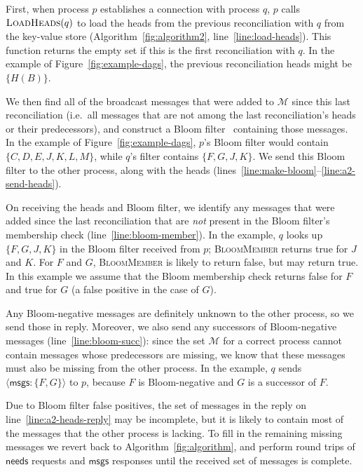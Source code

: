 \documentclass[a4paper,anonymous,USenglish]{lipics-v2019}
\begin{document}
First, when process $p$ establishes a connection with process $q$, $p$ calls $\textsc{LoadHeads}(q)$ to load the heads from the previous reconciliation with $q$ from the key-value store (Algorithm~\ref{fig:algorithm2}, line~\ref{line:load-heads}).
This function returns the empty set if this is the first reconciliation with $q$.
In the example of Figure~\ref{fig:example-dags}, the previous reconciliation heads might be $\{H(B)\}$.

We then find all of the broadcast messages that were added to $\mathcal{M}$ since this last reconciliation (i.e.\ all messages that are not among the last reconciliation's heads or their predecessors), and construct a Bloom filter~\cite{Bloom:1970} containing those messages.
In the example of Figure~\ref{fig:example-dags}, $p$'s Bloom filter would contain $\{C, D, E, J, K, L, M\}$, while $q$'s filter contains $\{F, G, J, K\}$.
We send this Bloom filter to the other process, along with the heads (lines~\ref{line:make-bloom}--\ref{line:a2-send-heads}).

On receiving the heads and Bloom filter, we identify any messages that were added since the last reconciliation that are \emph{not} present in the Bloom filter's membership check (line~\ref{line:bloom-member}).
In the example, $q$ looks up $\{F, G, J, K\}$ in the Bloom filter received from $p$; \textsc{BloomMember} returns true for $J$ and $K$. For $F$ and $G$, \textsc{BloomMember} is likely to return false, but may return true.
In this example we assume that the Bloom membership check returns false for $F$ and true for $G$ (a false positive in the case of $G$).

Any Bloom-negative messages are definitely unknown to the other process, so we send those in reply.
Moreover, we also send any successors of Bloom-negative messages (line~\ref{line:bloom-succ}): since the set $\mathcal{M}$ for a correct process cannot contain messages whose predecessors are missing, we know that these messages must also be missing from the other process.
In the example, $q$ sends $\langle\mathsf{msgs}: \{F, G\}\rangle$ to $p$, because $F$ is Bloom-negative and $G$ is a successor of $F$.

Due to Bloom filter false positives, the set of messages in the reply on line~\ref{line:a2-heads-reply} may be incomplete, but it is likely to contain most of the messages that the other process is lacking.
To fill in the remaining missing messages we revert back to Algorithm~\ref{fig:algorithm}, and perform round trips of $\mathsf{needs}$ requests and $\mathsf{msgs}$ responses until the received set of messages is complete.
\end{document}
